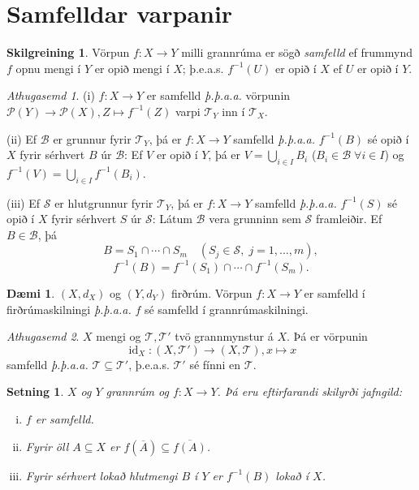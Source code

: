 \documentclass[a4paper,icelandic]{book}
\theoremstyle{definition}
\newtheorem{skilgr}{Skilgreining}[section]
\newtheorem{daemi}{Dæmi}[section]
\theoremstyle{plain}
\newtheorem{setn}{Setning}[section]
\theoremstyle{remark}
\newtheorem*{ath}{Athugasemd}
\DeclareMathOperator{\id}{id} %
\begin{document}
\section{Samfelldar varpanir}
\begin{skilgr}
  Vörpun $f:X\to Y$ milli grannrúma er sögð \emph{samfelld} ef frummynd $f$ opnu mengi í $Y$ er opið mengi í $X$; þ.e.a.s.
  $f^{-1}(U)$ er opið í $X$ ef $U$ er opið í $Y$.
\end{skilgr}
\begin{ath}
  (i) $f:X\to Y$ er samfelld \emph{þ.þ.a.a.} vörpunin $\mathcal P(Y)\to \mathcal
  P(X), Z\mapsto f^{-1}(Z)$ varpi $\mathcal T_Y$ inn í $\mathcal T_X$.

  (ii) Ef $\mathcal B$ er grunnur fyrir $\mathcal T_Y$, þá er $f:X\to Y$
  samfelld \emph{þ.þ.a.a.} $f^{-1}(B)$ sé opið í $X$ fyrir sérhvert $B$ úr
  $\mathcal B$: Ef $V$ er opið í $Y$, þá er $V=\bigcup_{i\in I}B_i$ ($B_i\in
  \mathcal B \; \forall i\in I$) og $f^{-1}(V) = \bigcup_{i\in I} f^{-1}(B_i)$.

  (iii) Ef $\mathcal S$ er hlutgrunnur fyrir $\mathcal T_Y$, þá er $f:X\to Y$
  samfelld \emph{þ.þ.a.a.} $f^{-1}(S)$ sé opið í $X$ fyrir sérhvert $S$ úr
  $\mathcal S$: Látum $\mathcal B$ vera grunninn sem $\mathcal S$ framleiðir. Ef
  $B\in\mathcal B$, þá
  \[
  B = S_1\cap\cdots\cap S_m \quad (S_j\in\mathcal S, \; j=1,\dots,m),
  \]
  \[
  f^{-1}(B) = f^{-1}(S_1)\cap\cdots\cap f^{-1}(S_m).
  \]
\end{ath}
\begin{daemi}
  $(X,d_X)$ og $(Y,d_Y)$ firðrúm. Vörpun $f:X\to Y$ er samfelld í
  firðrúmaskilningi \emph{þ.þ.a.a.} $f$ sé samfelld í grannrúmaskilningi.
\end{daemi}
\begin{ath}
  $X$ mengi og $\mathcal T, \mathcal T'$ tvö grannmynstur á $X$. Þá er vörpunin
  \[
  \id_X: (X,\mathcal T') \to (X,\mathcal T), x\mapsto x
  \]
  samfelld \emph{þ.þ.a.a.} $\mathcal T\subseteq \mathcal T'$, þ.e.a.s. $\mathcal
  T'$ sé fínni en $\mathcal T$.
\end{ath}
\begin{setn}
  $X$ og $Y$ grannrúm og $f:X\to Y$. Þá eru eftirfarandi skilyrði jafngild:
  \begin{enumerate}[(i)]
    \item $f$ er samfelld.
    \item Fyrir öll $A\subseteq X$ er $f(\overline A) \subseteq \overline{f(A)}$.
    \item Fyrir sérhvert lokað hlutmengi $B$ í $Y$ er $f^{-1}(B)$ lokað í $X$. 
  \end{enumerate}
\end{setn}
\end{document}
